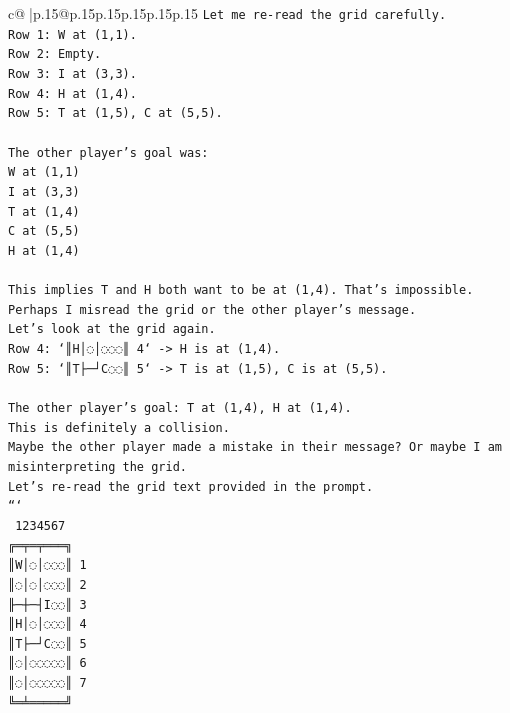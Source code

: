 \documentclass{article}
\begin{document}
{\begin{supertabular}{c@{$\;$}|p{.15\linewidth}@{}p{.15\linewidth}p{.15\linewidth}p{.15\linewidth}p{.15\linewidth}p{.15\linewidth}}
{{{\texttt{Let me re{-}read the grid carefully.} \\
\texttt{Row 1: W at (1,1).} \\
\texttt{Row 2: Empty.} \\
\texttt{Row 3: I at (3,3).} \\
\texttt{Row 4: H at (1,4).} \\
\texttt{Row 5: T at (1,5), C at (5,5).} \\
\\ 
\texttt{The other player's goal was:} \\
\texttt{W at (1,1)} \\
\texttt{I at (3,3)} \\
\texttt{T at (1,4)} \\
\texttt{C at (5,5)} \\
\texttt{H at (1,4)} \\
\\ 
\texttt{This implies T and H both want to be at (1,4). That's impossible.} \\
\texttt{Perhaps I misread the grid or the other player's message.} \\
\texttt{Let's look at the grid again.} \\
\texttt{Row 4: `║H│◌│◌◌◌║ 4` {-}> H is at (1,4).} \\
\texttt{Row 5: `║T├─┘C◌◌║ 5` {-}> T is at (1,5), C is at (5,5).} \\
\\ 
\texttt{The other player's goal: T at (1,4), H at (1,4).} \\
\texttt{This is definitely a collision.} \\
\texttt{Maybe the other player made a mistake in their message? Or maybe I am misinterpreting the grid.} \\
\texttt{Let's re{-}read the grid text provided in the prompt.} \\
\texttt{```} \\
\texttt{ 1234567} \\
\texttt{╔═╤═╤═══╗} \\
\texttt{║W│◌│◌◌◌║ 1} \\
\texttt{║◌│◌│◌◌◌║ 2} \\
\texttt{╟─┼─┤I◌◌║ 3} \\
\texttt{║H│◌│◌◌◌║ 4} \\
\texttt{║T├─┘C◌◌║ 5} \\
\texttt{║◌│◌◌◌◌◌║ 6} \\
\texttt{║◌│◌◌◌◌◌║ 7} \\
\texttt{╚═╧═════╝} \\
}}}
\end{supertabular}}
\end{document}
